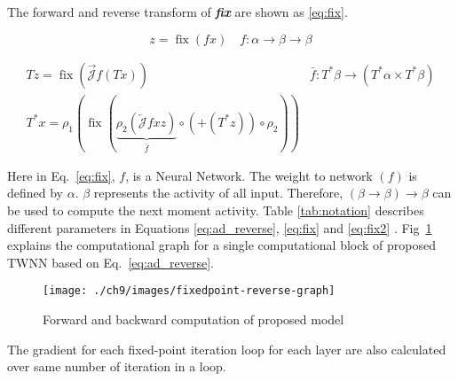 \documentclass{article}
\begin{document}
The forward and reverse transform of \textbf{\textit{fix}} are shown as \eqref{eq:fix}.

\begin{equation}
z=\operatorname{fix}(f x) \quad f: \alpha \rightarrow \beta \rightarrow \beta
\label{eq:fix}
\end{equation}

\begin{equation}\begin{array}{cc}
T z=\operatorname{fix}(\overrightarrow{\mathcal{J}} f(T x)) & \bar{f}: T^{*} \beta \rightarrow\left(T^{*} \alpha \times T^{*} \beta\right) \\
T^{*} x=\rho_{1}\left(\operatorname{fix}(\underbrace{\rho_{2}(\overleftarrow{\mathcal{J}} f x z)}_{\bar{f}} \circ\left(+\left(T^{*} z\right)\right) \circ \rho_{2})\right)
\label{eq:fix2}
\end{array}\end{equation}

Here in Eq.~\eqref{eq:fix}, $f$, is a Neural Network. The weight to network $(f)$ is defined by $\alpha$. $\beta$ represents the activity of all input. Therefore, $(\beta \rightarrow \beta) \rightarrow \beta$ can be used to compute the next moment activity. Table \ref{tab:notation} describes different parameters in Equations \ref{eq:ad_reverse}, \ref{eq:fix} and \ref{eq:fix2} . Fig~\ref{fig:fixedpoint-reverse-graph} explains the computational graph for a single computational block of  proposed TWNN based on Eq.~\eqref{eq:ad_reverse}.

\begin{figure}[ht]
	\centering
	\texttt{[image: ./ch9/images/fixedpoint-reverse-graph]}
	\caption{Forward and backward computation of proposed model}
	\label{fig:fixedpoint-reverse-graph}
\end{figure}

The gradient for each fixed-point iteration loop for each layer are also calculated over same number of iteration in a loop. 


\end{document}
